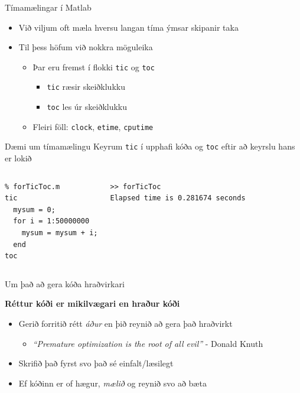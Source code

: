 \documentclass{beamer}
\begin{document}
\begin{frame}{Tímamælingar í Matlab}
\begin{itemize}
 \item Við viljum oft mæla hversu langan tíma ýmsar skipanir taka 
 \item Til þess höfum við nokkra möguleika
 \begin{itemize}
  \item Þar eru fremst í flokki \texttt{tic} og \texttt{toc}
  \begin{itemize}
   \item \texttt{tic} ræsir skeiðklukku
   \item \texttt{toc} les úr skeiðklukku
  \end{itemize}
  \item Fleiri föll: \texttt{clock}, \texttt{etime}, \texttt{cputime}
 \end{itemize}
\end{itemize}
\end{frame}

\begin{frame}[fragile]{Dæmi um tímamælingu}
\vspace{\baselineskip}
Keyrum \texttt{tic} í upphafi kóða og \texttt{toc} eftir að keyrslu hans er lokið
\begin{columns}
\begin{verbatim}
% forTicToc.m
tic
  mysum = 0;
  for i = 1:50000000
    mysum = mysum + i;
  end
toc
\end{verbatim}
\begin{verbatim}
>> forTicToc
Elapsed time is 0.281674 seconds
\end{verbatim}
\end{columns}
\end{frame}

\begin{frame}{Um það að gera kóða hraðvirkari}
    \pause
    \begin{center}
        \large \textbf{Réttur kóði er mikilvægari en hraður kóði}
    \end{center}
    \pause
    \begin{itemize}
        \item Gerið forritið rétt \emph{áður} en þið reynið að gera það hraðvirkt
        \begin{itemize}
            \item \emph{``Premature optimization is the root of all evil''} - Donald Knuth
        \end{itemize}
        \item Skrifið það fyrst svo það sé einfalt/læsilegt
        \item Ef kóðinn er of hægur, \emph{mælið} og reynið svo að bæta
    \end{itemize}
\end{frame}
\end{document}

